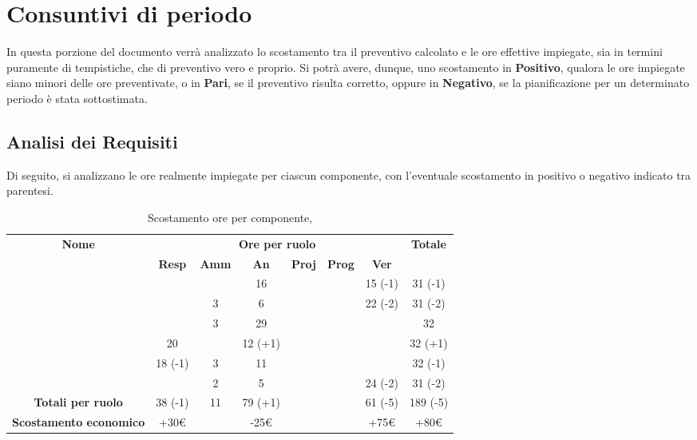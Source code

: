 \newpage

\section{Consuntivi di periodo}

In questa porzione del documento verrà analizzato lo scostamento tra il preventivo calcolato e le ore effettive impiegate, sia in termini puramente di tempistiche, che di preventivo vero e proprio. Si potrà avere, dunque, uno scostamento in \textbf{Positivo}, qualora le ore impiegate siano minori delle ore preventivate, o in \textbf{Pari}, se il preventivo risulta corretto, oppure in \textbf{Negativo}, se la pianificazione per un determinato periodo è stata sottostimata.

\subsection{Analisi dei Requisiti}

Di seguito, si analizzano le ore realmente impiegate per ciascun componente, con l'eventuale scostamento in positivo o negativo indicato tra parentesi.

\begin{table}[H]
	\begin{center}
		\begin{tabular}{|c|c|c|c|c|c|c|c|}
			\hline
			\textbf{Nome} & \multicolumn{6}{c|}{\textbf{Ore per ruolo}} & \textbf{Totale} \\\cline{2-7}
			& \textbf{Resp} & \textbf{Amm} & \textbf{An} & \textbf{Proj} & \textbf{Prog} & \textbf{Ver} & \\
			\hline
			\MC			&		&		&	16	&		&		&	15 (-1)	&	31 (-1)	\\
			\hline
			\AN			&		&	3	&	6	&	 	&		&	22 (-2)	& 	31 (-2)	\\
			\hline
			\DAN		&		&	3	&	29 	&		&		&		&	32	\\
			\hline
			\AS			&	20	&	 	&	12 (+1) 	&		&	 	& 		&	32 (+1)	\\
			\hline
			\NS 		&	18 (-1)	&	3	&	11	&		&		& 		&	32 (-1)	\\
			\hline
			\DS			& 		&	2	&	5	&		&		&	24 (-2)	&	31 (-2)	\\
			\hline
			\textbf{Totali per ruolo}	& 	38 (-1)	&	11	&	79 (+1)	&		&		&	61 (-5)	&	189 (-5)	\\
			\hline
			\textbf{Scostamento economico}	& 	+30€	&		&	-25€	&		&		&	+75€	&	+80€	\\
			\hline
		\end{tabular}
	\end{center}
	\caption{Scostamento ore per componente, \AdR}
\end{table}


